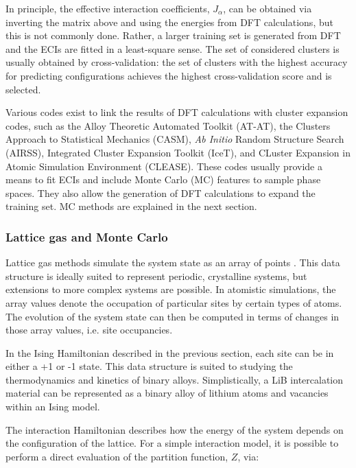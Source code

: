 \documentclass[../main.tex]{subfiles}
\begin{document}
In principle, the effective interaction coefficients, $J_\alpha$, can be obtained via inverting the matrix above and using the energies from DFT calculations, but this is not commonly done. Rather, a larger training set is generated from DFT and the ECIs are fitted in a least-square sense. The set of considered clusters is usually obtained by cross-validation: the set of clusters with the highest accuracy for predicting configurations achieves the highest cross-validation score and is selected.

Various codes exist to link the results of DFT calculations with cluster expansion codes, such as the Alloy Theoretic Automated Toolkit (AT-AT),\cite{avdw:atat2,avdw:atat,VandeWalle2002} the Clusters Approach to Statistical Mechanics (CASM),\cite{natarajan2017} \textit{Ab Initio} Random Structure Search (AIRSS),\cite{Pickard_2011} Integrated Cluster Expansion Toolkit (IceT),\cite{angvist2019} and CLuster Expansion in Atomic Simulation Environment (CLEASE).\cite{chang2019} These codes usually provide a means to fit ECIs and include Monte Carlo (MC) features to sample phase spaces. They also allow the generation of DFT calculations to expand the training set. MC methods are explained in the next section.

\subsubsection{Lattice gas and Monte Carlo}
\label{sec:monte_carlo}

Lattice gas methods simulate the system state as an array of points \cite{Binder2009book}. This data structure is ideally suited to represent periodic, crystalline systems, but extensions to more complex systems are possible. In atomistic simulations, the array values denote the occupation of particular sites by certain types of atoms. The evolution of the system state can then be computed in terms of changes in those array values, i.e. site occupancies.\cite{Binder2009book}
    
In the Ising Hamiltonian described in the previous section, each site can be in either a +1 or -1 state.\cite{lee1952} This data structure is suited to studying the thermodynamics and kinetics of binary alloys.\cite{PMERCER2016394,oviedo2015underpotential} Simplistically, a LiB intercalation material can be represented as a binary alloy of lithium atoms and vacancies within an Ising model.\cite{persson2010,mercer_influence_2017,Kim2001h}   
    
The interaction Hamiltonian describes how the energy of the system depends on the configuration of the lattice. For a simple interaction model, it is possible to perform a direct evaluation of the partition function, $Z$, via:
    
\end{document}
